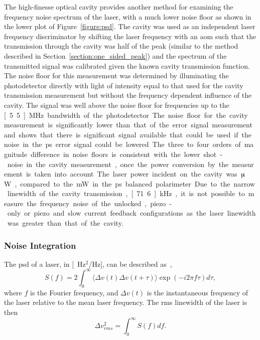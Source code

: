 The high-finesse optical cavity provides another method for examining the frequency noise spectrum of the laser, with a much lower noise floor as shown in the lower plot of Figure~\ref{figure:psd}.
The cavity was used as an independent laser frequency discriminator by shifting the laser frequency with an \gls{aom} such that the transmission through the cavity was half of the peak (similar to the method described in Section~\ref{section:one_sided_peak}) and the spectrum of the transmitted signal was calibrated given the known cavity transmission function.
The noise floor for this measurement was determined by illuminating the photodetector directly with light of intensity equal to that used for the cavity transmission measurement but without the frequency dependent influence of the cavity.
The signal was well above the noise floor for frequencies up to the \unit[5.5]{MHz} bandwidth of the photodetector.
The noise floor for the cavity measurement is significantly lower than that of the error signal measurement and shows that there is significant signal available that could be used if the noise in the \gls{ps} error signal could be lowered.
The three to four orders of magnitude difference in noise floors is consistent with the lower shot-noise in the cavity measurement, once the power conversion by the measurement is taken into account.
The laser power incident on the cavity was \unit[10]{$\muup$W}, compared to the \unit[1]{mW} in the \gls{ps} balanced polarimeter.
Due to the narrow linewidth of the cavity transmission, \unit[71.6]{kHz}, it is not possible to measure the frequency noise of the unlocked, piezo-only or piezo and slow current feedback configurations as the laser linewidth was greater than that of the cavity.

\subsubsection{Noise Integration}

The \gls{psd} of a laser, in \unit[Hz$^2$/Hz], can be described as~\cite{turner_frequency_2002},
\begin{equation}
S(f)=2\int_0^\infty \langle\Delta v(t)\Delta v(t+\tau)\rangle\exp(-i2\pi f \tau)d\tau,
\end{equation}
where $f$ is the Fourier frequency, and $\Delta v (t)$ is the instantaneous frequency of the laser relative to the mean laser frequency.
The \gls{rms} linewidth of the laser is then
\begin{equation}\label{equation:noise_integration}
\Delta v^2_{rms} = \int_0^\infty S(f) df.
\end{equation}

